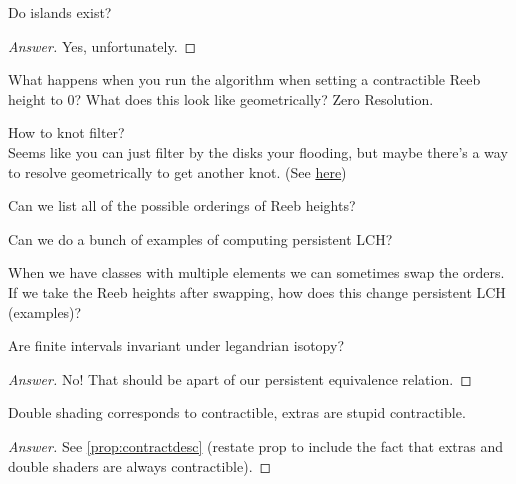 \documentclass[General-Information/Most_recent_log(3_0).tex]{subfiles}
\begin{document}
\begin{question}
    Do islands exist?
\end{question}
\begin{proof}[Answer]
    Yes, unfortunately.
\end{proof}



\begin{question}
    What happens when you run the algorithm when setting a contractible Reeb height to 0? What does this look like geometrically? Zero Resolution.
\end{question}

\begin{question}
    How to knot filter? \\
    Seems like you can just filter by the disks your flooding, but maybe there's a way to resolve geometrically to get another knot. (See \href{http://www.math.titech.ac.jp/~kalman/cobordism-talk.pdf}{here})
\end{question}



\begin{question}

Can we list all of the possible orderings of Reeb heights?
\end{question}

\begin{question}

Can we do a bunch of examples of computing persistent LCH?
\end{question}

\begin{question}
When we have classes with multiple elements we can sometimes swap the orders. If we take the Reeb heights after swapping, how does this change persistent LCH (examples)?
\end{question}

\begin{question}
Are finite intervals invariant under legandrian isotopy?
\end{question}
\begin{proof}[Answer]
    No! That should be apart of our persistent equivalence relation.
\end{proof}

\begin{question}
Double shading corresponds to contractible, extras are stupid contractible.
\end{question}
\begin{proof}[Answer]
    See \ref{prop:contractdesc} (\TODO restate prop to include the fact that extras and double shaders are always contractible).
\end{proof}
\end{document}
